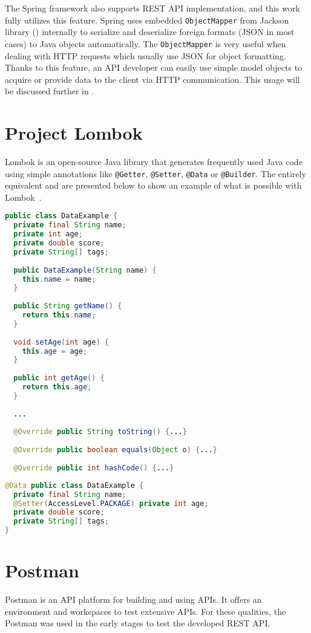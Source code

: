 The Spring framework also supports REST API implementation, and this work fully utilizes this feature.
Spring uses embedded \texttt{Object\-Mapper} from Jackson library () internally to serialize and deserialize foreign formats (JSON in most cases) to Java objects automatically. The \texttt{ObjectMapper} is very useful when dealing with HTTP requests which usually use JSON for object formatting. Thanks to this feature, an API developer can easily use simple model objects to acquire or provide data to the client via HTTP communication.
This usage will be discussed further in .


\section{Project Lombok} \label{sec:lombok}
Lombok is an open-source Java library that generates frequently used Java code using simple annotations like \texttt{@Getter}, \texttt{@Setter}, \texttt{@Data} or \texttt{@Builder}.
The entirely equivalent  and  are presented below to show an example of what is possible with Lombok~\cite{lombok}.
\begin{lstlisting}[language=Java, caption=Vanilla Java, label=lst:vanilla]
public class DataExample {
  private final String name;
  private int age;
  private double score;
  private String[] tags;
  
  public DataExample(String name) {
    this.name = name;
  }
  
  public String getName() {
    return this.name;
  }
  
  void setAge(int age) {
    this.age = age;
  }
  
  public int getAge() {
    return this.age;
  }
  
  ...
  
  @Override public String toString() {...}
  
  @Override public boolean equals(Object o) {...}
  
  @Override public int hashCode() {...}
\end{lstlisting}
\begin{lstlisting}[language=Java, caption=Java with Lombok, label=lst:lombok]
@Data public class DataExample {
  private final String name;
  @Setter(AccessLevel.PACKAGE) private int age;
  private double score;
  private String[] tags;
}
\end{lstlisting}


\section{Postman} \label{sec:postman}
Postman is an API platform for building and using APIs. It offers an environment and workspaces to test extensive APIs.
For these qualities, the Postman was used in the early stages to test the developed REST API.



